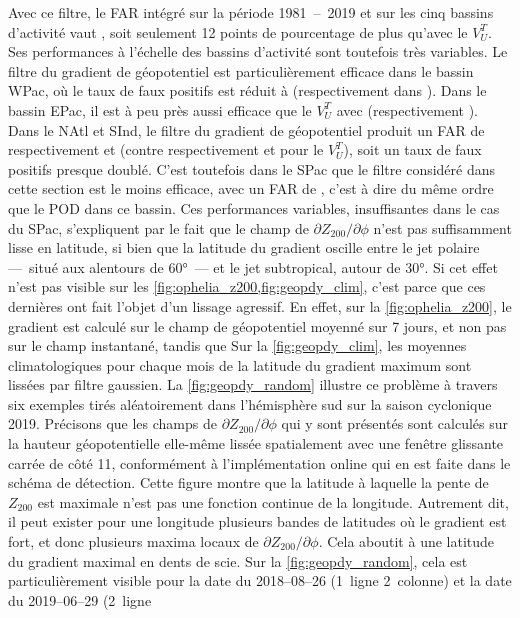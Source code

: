 \documentclass[../main.tex]{subfiles}
\begin{document}
Avec ce filtre, le FAR intégré sur la période \num{1981}~--~\num{2019} et sur les cinq bassins d'activité vaut , soit seulement 12 points de
pourcentage de plus qu'avec le $V_U^T$. Ses performances à l'échelle des bassins d'activité sont toutefois très variables. Le filtre du gradient de géopotentiel
est particulièrement efficace dans le bassin WPac, où le taux de faux positifs est réduit à  (respectivement  dans
\cite{dulac_assessing_2023}). Dans le bassin EPac, il est à peu près aussi efficace que le $V_U^T$ avec  (respectivement ). Dans le NAtl et
SInd, le filtre du gradient de géopotentiel produit un FAR de respectivement  et  (contre respectivement  et  pour le
$V_U^T$), soit un taux de faux positifs presque doublé. C'est toutefois dans le SPac que le filtre considéré dans cette section est le moins efficace, avec un
FAR de , c'est à dire du même ordre que le POD dans ce bassin. Ces performances variables, insuffisantes dans le cas du SPac, s'expliquent par le fait
que le champ de $\partial Z_{200} / \partial \phi$ n'est pas suffisamment lisse en latitude, si bien que la latitude du gradient oscille entre le jet polaire
---~situé aux alentours de \ang{60}~--- et le jet subtropical, autour de \ang{30}. Si cet effet n'est pas visible sur les
\cref{fig:ophelia_z200,fig:geopdy_clim}, c'est parce que ces dernières ont fait l'objet d'un lissage agressif. En effet, sur la \cref{fig:ophelia_z200}, le
gradient est calculé sur le champ de géopotentiel moyenné sur \num{7} jours, et non pas sur le champ instantané, tandis que Sur la \cref{fig:geopdy_clim}, les
moyennes climatologiques pour chaque mois de la latitude du gradient maximum sont lissées par filtre gaussien. La \cref{fig:geopdy_random} illustre ce problème
à travers six exemples tirés aléatoirement dans l'hémisphère sud sur la saison cyclonique 2019. Précisons que les champs de $\partial Z_{200} / \partial \phi$
qui y sont présentés sont calculés sur la hauteur géopotentielle elle-même lissée spatialement avec une fenêtre glissante carrée de côté 11, conformément à
l'implémentation online qui en est faite dans le schéma de détection. Cette figure montre que la latitude à laquelle la pente de $Z_{200}$ est maximale n'est
pas une fonction continue de la longitude. Autrement dit, il peut exister pour une longitude plusieurs bandes de latitudes où le gradient est fort, et donc
plusieurs maxima locaux de $\partial Z_{200} / \partial \phi$. Cela aboutit à une latitude du gradient maximal en dents de scie. Sur la
\cref{fig:geopdy_random}, cela est particulièrement visible pour la date du 2018--08--26 (1\iere~ligne 2\ieme~colonne) et la date du 2019--06--29 (2\ieme~ligne
\end{document}
